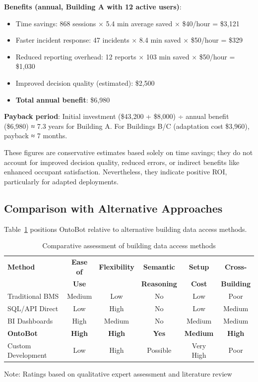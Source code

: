 \documentclass[acmlarge]{acmart}
\begin{document}
\textbf{Benefits (annual, Building A with 12 active users)}:
\begin{itemize}
    \item Time savings: 868 sessions × 5.4 min average saved × \$40/hour = \$3,121
    \item Faster incident response: 47 incidents × 8.4 min saved × \$50/hour = \$329
    \item Reduced reporting overhead: 12 reports × 103 min saved × \$50/hour = \$1,030
    \item Improved decision quality (estimated): \$2,500
    \item \textbf{Total annual benefit}: \$6,980
\end{itemize}

\textbf{Payback period}: Initial investment (\$43,200 + \$8,000) ÷ annual benefit (\$6,980) ≈ 7.3 years for Building A. For Buildings B/C (adaptation cost \$3,960), payback ≈ 7 months.

These figures are conservative estimates based solely on time savings; they do not account for improved decision quality, reduced errors, or indirect benefits like enhanced occupant satisfaction. Nevertheless, they indicate positive ROI, particularly for adapted deployments.

\subsection{Comparison with Alternative Approaches}

Table~\ref{tab:alternative-comparison} positions OntoBot relative to alternative building data access methods.

\begin{table}[h]
\centering
\begin{threeparttable}
\caption{Comparative assessment of building data access methods}
\label{tab:alternative-comparison}
\scriptsize
\begin{tabular}{@{}lccccc@{}}
\toprule
\textbf{Method} & \textbf{Ease of} & \textbf{Flexibility} & \textbf{Semantic} & \textbf{Setup} & \textbf{Cross-} \\
 & \textbf{Use} & & \textbf{Reasoning} & \textbf{Cost} & \textbf{Building} \\
\midrule
Traditional BMS & Medium & Low & No & Low & Poor \\
SQL/API Direct & Low & High & No & Low & Medium \\
BI Dashboards & High & Medium & No & Medium & Medium \\
\textbf{OntoBot} & \textbf{High} & \textbf{High} & \textbf{Yes} & \textbf{Medium} & \textbf{High} \\
Custom Development & Low & High & Possible & Very High & Poor \\
\bottomrule
\end{tabular}
\begin{tablenotes}
\small
\item Note: Ratings based on qualitative expert assessment and literature review
\end{tablenotes}
\end{threeparttable}
\end{table}
\end{document}
